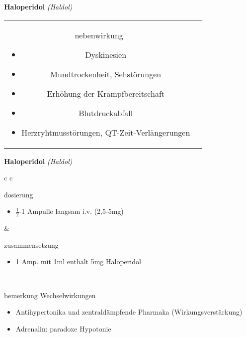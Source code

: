 \begin{frame}{
    \textbf{Haloperidol}
    \textit{(Haldol)}
}
\begin{tabular}{c c}
\begin{beamercolorbox}[wd=\boxwidth\textwidth,ht=\boxheight\textheight,sep=1em]{nebenwirkung}
            \scriptsize
            \begin{itemize}
                \item Dyskinesien
                \item Mundtrockenheit, Sehstörungen
                \item Erhöhung der Krampfbereitschaft
                \item Blutdruckabfall
                \item Herzryhtmusstörungen, QT-Zeit-Verlängerungen
            \end{itemize}
        \end{beamercolorbox} \\
    \end{tabular}
\end{frame}

\begin{frame}{
    \textbf{Haloperidol}
    \textit{(Haldol)}
}
    \begin{tabular}{c c}
        \begin{beamercolorbox}[wd=\boxwidth\textwidth,ht=\boxheight\textheight,sep=1em]{dosierung}
            \begin{itemize}
                \item $\frac{1}{2}$-1 Ampulle langsam i.v. (2,5-5mg)
            \end{itemize}
        \end{beamercolorbox} & 
        \begin{beamercolorbox}[wd=\boxwidth\textwidth,ht=\boxheight\textheight,sep=1em]{zusammensetzung}
            \begin{itemize}
                \item 1 Amp. mit 1ml enthält 5mg Haloperidol
            \end{itemize}
        \end{beamercolorbox} \\
        \begin{beamercolorbox}[wd=\textwidth,ht=\boxheight\textheight,sep=1em]{bemerkung}
            Wechselwirkungen
            \begin{itemize}
                \item Antihypertonika und zentraldämpfende Pharmaka (Wirkungsverstärkung)
                \item Adrenalin: paradoxe Hypotonie
            \end{itemize}
        \end{beamercolorbox} \\
    \end{tabular}
\end{frame}


